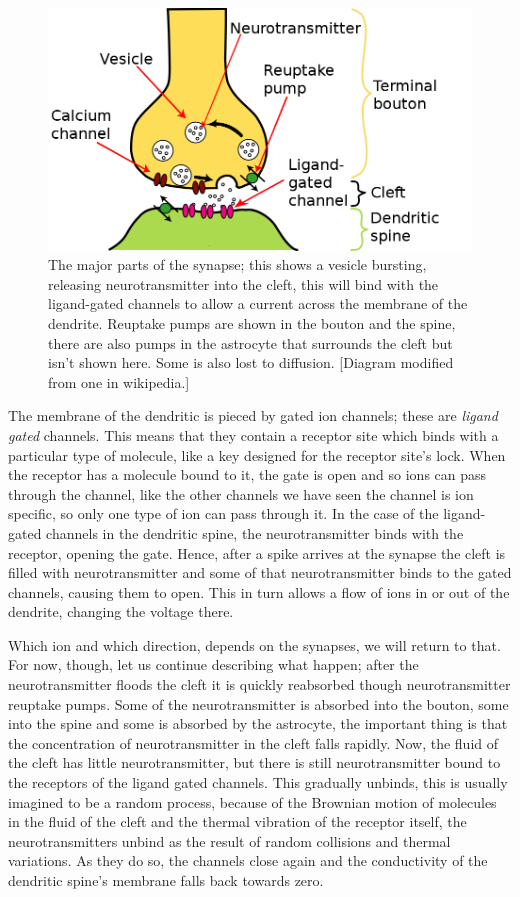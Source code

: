 \documentclass[11pt,a4paper]{scrartcl}
\begin{document}
\begin{figure}
\begin{center}
\includegraphics[width=12cm]{Synapse.png}
\end{center}
\caption{The major parts of the synapse; this shows a vesicle
  bursting, releasing neurotransmitter into the cleft, this will bind
  with the ligand-gated channels to allow a current across the
  membrane of the dendrite. Reuptake pumps are shown in the bouton and
  the spine, there are also pumps in the astrocyte that surrounds the cleft but isn't shown here. Some is also lost to diffusion. [Diagram modified from one in wikipedia.]}
\end{figure}


The membrane of the dendritic is pieced by gated ion channels; these
are \textsl{ligand gated} channels. This means that they contain a
receptor site which binds with a particular type of molecule, like a
key designed for the receptor site's lock. When the receptor has a
molecule bound to it, the gate is open and so ions can pass through
the channel, like the other channels we have seen the channel is ion
specific, so only one type of ion can pass through it. In the case of
the ligand-gated channels in the dendritic spine, the neurotransmitter
binds with the receptor, opening the gate. Hence, after a spike
arrives at the synapse the cleft is filled with neurotransmitter and
some of that neurotransmitter binds to the gated channels, causing
them to open. This in turn allows a flow of ions in or out of the
dendrite, changing the voltage there. 

Which ion and which direction, depends on the synapses, we will return
to that. For now, though, let us continue describing what happen;
after the neurotransmitter floods the cleft it is quickly reabsorbed
though neurotransmitter reuptake pumps. Some of the neurotransmitter
is absorbed into the bouton, some into the spine and some is absorbed
by the astrocyte, the important thing is that the concentration of
neurotransmitter in the cleft falls rapidly. Now, the fluid of the
cleft has little neurotransmitter, but there is still neurotransmitter
bound to the receptors of the ligand gated channels. This gradually
unbinds, this is usually imagined to be a random process, because of
the Brownian motion of molecules in the fluid of the cleft and the
thermal vibration of the receptor itself, the neurotransmitters unbind
as the result of random collisions and thermal variations. As they do
so, the channels close again and the conductivity of the dendritic
spine's membrane falls back towards zero.
\end{document}
